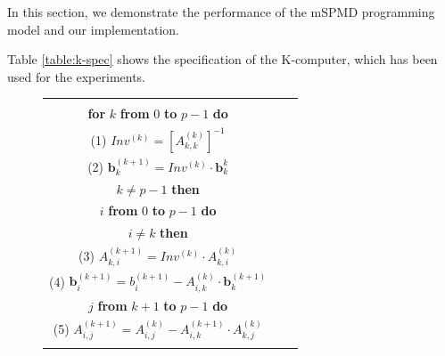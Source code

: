 \documentclass[graybox]{svmult}
\begin{document}
In this section, we demonstrate the performance of the mSPMD programming model and our implementation. 

Table \ref{table:k-spec} shows the specification of the K-computer, which has been used for the experiments.


\begin{figure}[t]
\begin{center}
\begin{tabular}[t]{|ccc|}\hline
\hspace*{3mm}&
\begin{minipage}[c]{0.5\hsize}
~\\
{\bf for} $k$ {\bf from} $0$ {\bf to} $p-1$ {\bf do}\\
\hspace*{1.2em}(1) $Inv^{(k)} = [A_{k,k}^{(k)}]^{-1}$\\
\hspace*{1.2em}(2) $\bm{b}_k^{(k+1)}=Inv^{(k)}\cdot \bm{b}_k^{k}$\\
\hspace*{1.2em}{\bf if} $k \neq p-1$ {\bf then}\\
\hspace*{1.2em}\hspace*{1.2em}{\bf for} $i$ {\bf from} $0$ {\bf to} $p-1$ {\bf do}\\
\hspace*{1.2em}\hspace*{1.2em}\hspace*{1.2em}{\bf if} $i \neq k$ {\bf then}\\
\hspace*{1.2em}\hspace*{1.2em}\hspace*{1.2em}\hspace*{1.2em}(3) $A_{k,i}^{(k+1)}=Inv^{(k)}\cdot A_{k,i}^{(k)}$\\
\hspace*{1.2em}\hspace*{1.2em}\hspace*{1.2em}\hspace*{1.2em}(4) $\bm{b}_i^{(k+1)}=b_i^{(k+1)}-A_{i,k}^{(k)}\cdot \bm{b}_k^{(k+1)}$\\
\hspace*{1.2em}\hspace*{1.2em}\hspace*{1.2em}\hspace*{1.2em}{\bf for} $j$ {\bf from} $k+1$ {\bf to} $p-1$ {\bf do}\\
\hspace*{1.2em}\hspace*{1.2em}\hspace*{1.2em}\hspace*{1.2em}\hspace*{1.2em}(5) $A_{i,j}^{(k+1)} = A_{i,j}^{(k)}-A_{i,k}^{(k+1)}\cdot A_{k,j}^{(k)}$\\

\end{minipage}
\end{tabular}
\end{center}
\end{figure}
\end{document}
